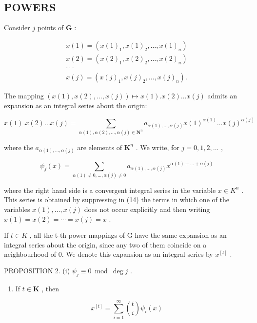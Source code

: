 \subsection{POWERS}

Consider \(j\) points of \(\mathbf{G}\) :

\[
\begin{array}{l} x (1) = (x (1) _ {1}, x (1) _ {2}, \ldots , x (1) _ {n}) \\ x (2) = (x (2) _ {1}, x (2) _ {2}, \ldots , x (2) _ {n}) \\ \cdot \cdot \cdot \\ x (j) = (x (j) _ {1}, x (j) _ {2}, \ldots , x (j) _ {n}). \end{array}
\]

The mapping \((x(1), x(2), \ldots, x(j)) \mapsto x(1).x(2) \ldots x(j)\) admits an expansion as an integral series about the origin:

\[
x (1). x (2) \dots x (j) = \sum_ {\alpha (1), \alpha (2), \dots , \alpha (j) \in \mathbf {N} ^ {n}} a _ {\alpha (1), \dots , \alpha (j)} x (1) ^ {\alpha (1)} \dots x (j) ^ {\alpha (j)}\tag{14}
\]

where the \(a_{\alpha(1), \ldots, \alpha(j)}\) are elements of \(\mathbf{K}^n\) . We write, for \(j = 0, 1, 2, \ldots\) ,

\[
\psi_ {j} (x) = \sum_ {\alpha (1) \neq 0, \dots , \alpha (j) \neq 0} a _ {\alpha (1), \dots , \alpha (j)} x ^ {\alpha (1) + \dots + \alpha (j)}\tag{15}
\]

where the right hand side is a convergent integral series in the variable \(x \in K^{n}\) . This series is obtained by suppressing in (14) the terms in which one of the variables \(x(1), \ldots, x(j)\) does not occur explicitly and then writing \(x(1) = x(2) = \cdots = x(j) = x\) .

If \(t \in K\) , all the t-th power mappings of G have the same expansion as an integral series about the origin, since any two of them coincide on a neighbourhood of 0. We denote this expansion as an integral series by \(x^{[t]}\) .

PROPOSITION 2. (i) \(\psi_{j} \equiv 0 \bmod \deg j\) .

\begin{enumerate}
\def\labelenumi{(\roman{enumi})}
\setcounter{enumi}{1}
\tightlist
\item
  If \(t\in \mathbf{K}\) , then
\end{enumerate}

\[
x ^ {[ t ]} = \sum_ {i = 1} ^ {\infty} \binom {t} {i} \psi_ {i} (x)\tag{16}
\]


